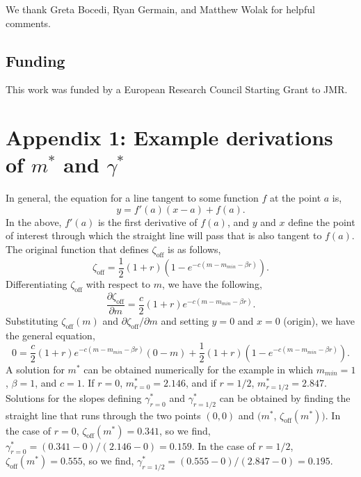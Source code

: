 \documentclass[12pt]{article}
\begin{document}
We thank Greta Bocedi, Ryan Germain, and Matthew Wolak for helpful comments.

\subsection*{Funding}

This work was funded by a European Research Council Starting Grant to JMR.

\section*{Appendix 1: Example derivations of $m^{*}$ and $\gamma^{*}$}

In general, the equation for a line tangent to some function $f$ at the point $a$ is,
\begin{equation}
y = f'\left(a\right)\left(x-a\right) + f\left(a\right).
\end{equation}
In the above, $f'(a)$ is the first derivative of $f(a)$, and $y$ and $x$ define the point of interest through which the straight line will pass that is also tangent to $f(a)$. The original function that defines $\zeta_{\textrm{off}}$ is as follows,
\begin{equation}
\zeta_{\textrm{off}} = \frac{1}{2}\left(1+r\right)\left(1-e^{-c\left(m-m_{min}-\beta r\right)}\right).
\end{equation}
Differentiating $\zeta_{\textrm{off}}$ with respect to $m$, we have the following,
\begin{equation}
\frac{\partial \zeta_{\textrm{off}}}{\partial m} = \frac{c}{2} \left(1+r\right)e^{-c\left(m-m_{min}-\beta r\right)}.
\end{equation}
Substituting $\zeta_{\textrm{off}}(m)$ and $\partial \zeta_{\textrm{off}} / \partial m$ and setting $y=0$ and $x=0$ (origin), we have the general equation, 
\begin{equation}
0 = \frac{c}{2} \left(1+r\right)e^{-c\left(m-m_{min}-\beta r\right)}\left(0-m\right) + \frac{1}{2}\left(1+r\right)\left(1-e^{-c\left(m-m_{min}-\beta r\right)}\right).
\end{equation}
A solution for $m^{*}$ can be obtained numerically for the example in which $m_{min}=1$, $\beta=1$, and $c=1$. If $r=0$, $m^{*}_{r=0}=2.146$, and if $r=1/2$, $m^{*}_{r=1/2}=2.847$. Solutions for the slopes defining $\gamma^{*}_{r=0}$ and $\gamma^{*}_{r=1/2}$ can be obtained by finding the straight line that runs through the two points $(0,0)$ and $(m^{*}$, $\zeta_{\textrm{off}}(m^{*}))$. In the case of $r=0$, $\zeta_{\textrm{off}}(m^{*})=0.341$, so we find, $\gamma^{*}_{r=0}=(0.341 - 0)/(2.146 - 0)=0.159$. In the case of $r=1/2$, $\zeta_{\textrm{off}}(m^{*})=0.555$, so we find, $\gamma^{*}_{r=1/2}=(0.555-0)/(2.847-0)=0.195$. 
\end{document}
